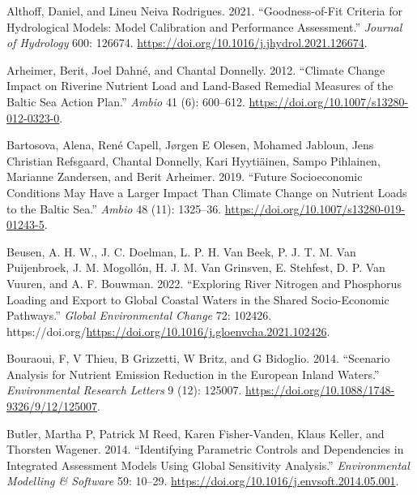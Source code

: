 \hypertarget{refs}{}
\begin{CSLReferences}{1}{0}
\leavevmode{}%
Althoff, Daniel, and Lineu Neiva Rodrigues. 2021. {``Goodness-of-Fit Criteria for Hydrological Models: Model Calibration and Performance Assessment.''} \emph{Journal of Hydrology} 600: 126674. \url{https://doi.org/10.1016/j.jhydrol.2021.126674}.

\leavevmode{}%
Arheimer, Berit, Joel Dahné, and Chantal Donnelly. 2012. {``Climate Change Impact on Riverine Nutrient Load and Land-Based Remedial Measures of the Baltic Sea Action Plan.''} \emph{Ambio} 41 (6): 600--612. \url{https://doi.org/10.1007/s13280-012-0323-0}.

\leavevmode{}%
Bartosova, Alena, René Capell, Jørgen E Olesen, Mohamed Jabloun, Jens Christian Refsgaard, Chantal Donnelly, Kari Hyytiäinen, Sampo Pihlainen, Marianne Zandersen, and Berit Arheimer. 2019. {``Future Socioeconomic Conditions May Have a Larger Impact Than Climate Change on Nutrient Loads to the Baltic Sea.''} \emph{Ambio} 48 (11): 1325--36. \url{https://doi.org/10.1007/s13280-019-01243-5}.

\leavevmode{}%
Beusen, A. H. W., J. C. Doelman, L. P. H. Van Beek, P. J. T. M. Van Puijenbroek, J. M. Mogollón, H. J. M. Van Grinsven, E. Stehfest, D. P. Van Vuuren, and A. F. Bouwman. 2022. {``Exploring River Nitrogen and Phosphorus Loading and Export to Global Coastal Waters in the Shared Socio-Economic Pathways.''} \emph{Global Environmental Change} 72: 102426. https://doi.org/\url{https://doi.org/10.1016/j.gloenvcha.2021.102426}.

\leavevmode{}%
Bouraoui, F, V Thieu, B Grizzetti, W Britz, and G Bidoglio. 2014. {``Scenario Analysis for Nutrient Emission Reduction in the European Inland Waters.''} \emph{Environmental Research Letters} 9 (12): 125007. \url{https://doi.org/10.1088/1748-9326/9/12/125007}.

\leavevmode{}%
Butler, Martha P, Patrick M Reed, Karen Fisher-Vanden, Klaus Keller, and Thorsten Wagener. 2014. {``Identifying Parametric Controls and Dependencies in Integrated Assessment Models Using Global Sensitivity Analysis.''} \emph{Environmental Modelling \& Software} 59: 10--29. \url{https://doi.org/10.1016/j.envsoft.2014.05.001}.


\end{CSLReferences}
